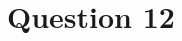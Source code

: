 \documentclass[11pt,notitlepage]{article}\usepackage[]{graphicx}\usepackage[]{color}
\makeatletter
\newenvironment{kframe}{%
 \def\at@end@of@kframe{}%
 \ifinner\ifhmode%
  \def\at@end@of@kframe{\end{minipage}}%
  \begin{minipage}{\columnwidth}%
 \fi\fi%
 \def\FrameCommand##1{\hskip\@totalleftmargin \hskip-\fboxsep
 \colorbox{shadecolor}{##1}\hskip-\fboxsep
     \hskip-\linewidth \hskip-\@totalleftmargin \hskip\columnwidth}%
 \MakeFramed {\advance\hsize-\width
   \@totalleftmargin\z@ \linewidth\hsize
   \@setminipage}}%
 {\par\unskip\endMakeFramed%
 \at@end@of@kframe}
\newenvironment{knitrout}{}{} %
\makeatother
\begin{document}
\section*{Question 12}
\begin{knitrout}
\color{fgcolor}\begin{kframe}
\begin{verbatim}





\end{verbatim}
\end{kframe}
\end{knitrout}
\end{document}

